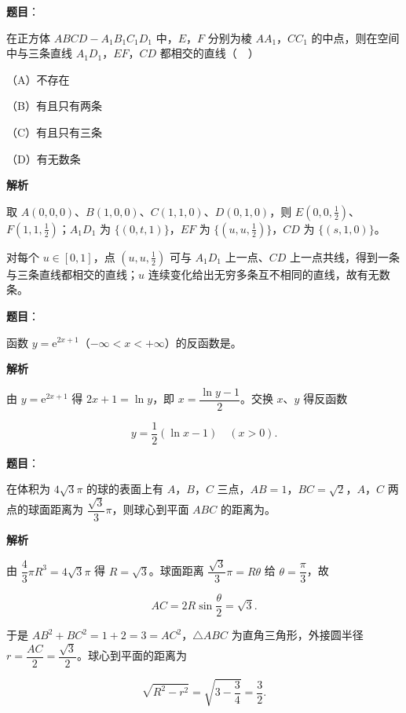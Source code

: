\begin{answer}

\textbf{题目}：

在正方体 $ABCD-A_1B_1C_1D_1$ 中，$E$，$F$ 分别为棱 $AA_1$，$CC_1$ 的中点，则在空间中与三条直线 $A_1D_1$，$EF$，$CD$ 都相交的直线（　）

（A）不存在

（B）有且只有两条

（C）有且只有三条

（D）有无数条

\textbf{解析}

取 $A(0,0,0)$、$B(1,0,0)$、$C(1,1,0)$、$D(0,1,0)$，则 $E\left(0,0,\tfrac12\right)$、$F\left(1,1,\tfrac12\right)$；$A_1D_1$ 为 $\{(0,t,1)\}$，$EF$ 为 $\{(u,u,\tfrac12)\}$，$CD$ 为 $\{(s,1,0)\}$。

对每个 $u\in[0,1]$，点 $(u,u,\tfrac12)$ 可与 $A_1D_1$ 上一点、$CD$ 上一点共线，得到一条与三条直线都相交的直线；$u$ 连续变化给出无穷多条互不相同的直线，故有无数条。


\end{answer}
\begin{answer}

\textbf{题目}：

函数 $y=\mathrm e^{2x+1}$（$-\infty<x<+\infty$）的反函数是\gkblank{}。

\textbf{解析}

由 $y=\mathrm e^{2x+1}$ 得 $2x+1=\ln y$，即 $x=\dfrac{\ln y-1}{2}$。交换 $x$、$y$ 得反函数

\nopagebreak[4]
\[y=\frac12(\ln x-1)\quad(x>0).\]


\end{answer}
\begin{answer}

\textbf{题目}：

在体积为 $4\sqrt3\pi$ 的球的表面上有 $A$，$B$，$C$ 三点，$AB=1$，$BC=\sqrt2$，$A$，$C$ 两点的球面距离为 $\dfrac{\sqrt3}{3}\pi$，则球心到平面 $ABC$ 的距离为\gkblank{}。

\textbf{解析}

由 $\dfrac43\pi R^3=4\sqrt3\pi$ 得 $R=\sqrt3$。球面距离 $\dfrac{\sqrt3}{3}\pi=R\theta$ 给 $\theta=\dfrac{\pi}{3}$，故

\nopagebreak[4]
\[AC=2R\sin\frac{\theta}{2}=\sqrt3.\]

于是 $AB^2+BC^2=1+2=3=AC^2$，$\triangle ABC$ 为直角三角形，外接圆半径 $r=\dfrac{AC}{2}=\dfrac{\sqrt3}{2}$。球心到平面的距离为

\nopagebreak[4]
\[\sqrt{R^2-r^2}=\sqrt{3-\frac34}=\frac32.\]


\end{answer}
